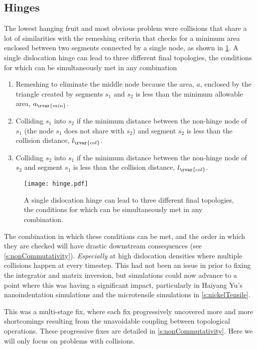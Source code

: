 \subsection{Hinges}\label{ss:hinges}
The lowest hanging fruit and most obvious problem were collisions that share a lot of similarities with the remeshing criteria that checks for a minimum area enclosed between two segments connected by a single node, as shown in \cref{f:hinge}. A single dislocation hinge can lead to three different final topologies, the conditions for which can be simultaneously met in any combination
\begin{enumerate}
    \item Remeshing to eliminate the middle node because the area, $a$, enclosed by the triangle created by segments $s_1$ and $s_2$ is less than the minimum allowable area, $a_{\rvar{min}}$.
    \item Colliding $s_1$ into $s_2$ if the minimum distance between the non-hinge node of $s_1$ (the node $s_1$ does not share with $s_2$) and segment $s_2$ is less than the collision distance, $l_{\rvar{col}}$.
    \item Colliding $s_2$ into $s_1$ if the minimum distance between the non-hinge node of $s_2$ and segment $s_1$ is less than the collision distance, $l_{\rvar{col}}$.
\end{enumerate}
\begin{figure}
    \centering
    \texttt{[image: hinge.pdf]}
    \caption[A single dislocation hinge can lead to three different final topologies.]{A single dislocation hinge can lead to three different final topologies, the conditions for which can be simultaneously met in any combination.}
    \label{f:hinge}
\end{figure}

The combination in which these conditions can be met, and the order in which they are checked will have drastic downstream consequences (see \cref{s:nonCommutativity}). \emph{Especially} at high dislocation densities where multiple collisions happen at every timestep. This had not been an issue in prior to fixing the integrator and matrix inversion, but simulations could now advance to a point where this was having a significant impact, particularly in Haiyang Yu's nanoindentation simulations and the microtensile simulations in \cref{s:nickelTensile}.

This was a multi-stage fix, where each fix progressively uncovered more and more shortcomings resulting from the unavoidable coupling between topological operations. These progressive fixes are detailed in \cref{s:nonCommutativity}. Here we will only focus on problems with collisions.

